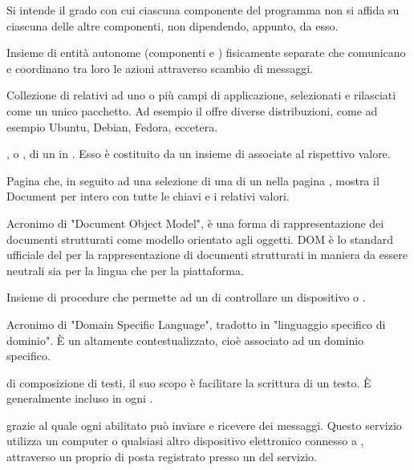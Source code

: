 {Si intende il grado con cui ciascuna componente del programma non si affida su ciascuna delle altre componenti, non dipendendo, appunto, da esso.}

{Insieme di entità autonome (componenti  e ) fisicamente separate che comunicano e coordinano tra loro le azioni attraverso scambio di messaggi.}

{Collezione di  relativi ad uno o più campi di applicazione, selezionati e rilasciati come un unico pacchetto. Ad esempio il   offre diverse distribuzioni, come ad esempio Ubuntu, Debian, Fedora, eccetera.}

{, o , di un  in . Esso è costituito da un insieme di  associate al rispettivo valore.}

{Pagina che, in seguito ad una selezione di una  di un  nella pagina , mostra il Document per intero con tutte le chiavi e i relativi valori.}

{Acronimo di "Document Object Model", è una forma di rappresentazione dei documenti strutturati come modello orientato agli oggetti.
DOM è lo standard ufficiale del  per la rappresentazione di documenti strutturati in maniera da essere neutrali sia per la lingua che per la piattaforma.}

{Insieme di procedure che permette ad un  di controllare un dispositivo  o .}

{Acronimo di "Domain Specific Language", tradotto in "linguaggio specifico di dominio". \`{E} un  altamente contestualizzato, cioè associato ad un dominio specifico.} 




{ di composizione di testi, il suo scopo è facilitare la scrittura di un testo. \`{E} generalmente incluso in ogni .}

{  grazie al quale ogni  abilitato può inviare e ricevere dei messaggi. Questo servizio utilizza un computer o qualsiasi altro dispositivo elettronico connesso a , attraverso un proprio  di posta registrato presso un  del servizio.}

